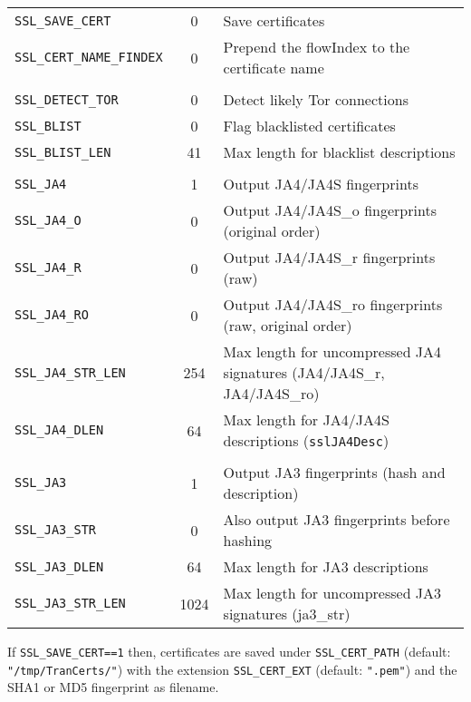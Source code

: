 \documentclass[documentation]{subfiles}
\begin{document}
\begin{longtable}{>{\tt}lcl}
    SSL\_SAVE\_CERT            & 0    & Save certificates\\
    SSL\_CERT\_NAME\_FINDEX    & 0    & Prepend the flowIndex to the certificate name\\
    \\
    SSL\_DETECT\_TOR           & 0    & Detect likely Tor connections\\
    SSL\_BLIST                 & 0    & Flag blacklisted certificates\\                    %
    SSL\_BLIST\_LEN            & 41   & Max length for blacklist descriptions\\            %
    \\
    SSL\_JA4                   & 1    & Output JA4/JA4S fingerprints\\
    SSL\_JA4\_O                & 0    & Output JA4/JA4S\_o fingerprints (original order)\\
    SSL\_JA4\_R                & 0    & Output JA4/JA4S\_r fingerprints (raw)\\
    SSL\_JA4\_RO               & 0    & Output JA4/JA4S\_ro fingerprints (raw, original order)\\
    SSL\_JA4\_STR\_LEN         & 254  & Max length for uncompressed JA4 signatures (JA4/JA4S\_r, JA4/JA4S\_ro)\\
    SSL\_JA4\_DLEN             & 64   & Max length for JA4/JA4S descriptions ({\small\tt sslJA4Desc})\\
    \\
    SSL\_JA3                   & 1    & Output JA3 fingerprints (hash and description)\\   %
    SSL\_JA3\_STR              & 0    & Also output JA3 fingerprints before hashing\\      %
    SSL\_JA3\_DLEN             & 64   & Max length for JA3 descriptions\\
    SSL\_JA3\_STR\_LEN         & 1024 & Max length for uncompressed JA3 signatures (ja3\_str)\\
    \bottomrule
\end{longtable}

If {\tt SSL\_SAVE\_CERT==1} then, certificates are saved under {\tt SSL\_CERT\_PATH} (default: {\tt "/tmp/TranCerts/"}) with the extension {\tt SSL\_CERT\_EXT} (default: {\tt ".pem"}) and the SHA1 or MD5 fingerprint as filename.
\end{document}
